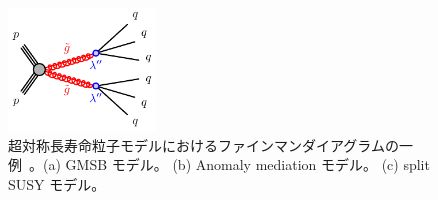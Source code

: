 \begin{figure}[tbp]
    \begin{minipage}{0.98\hsize}
    \centering
    \includegraphics[width=0.35\textwidth]{img/diagram/gogo-3q3q-RPV.pdf}
    \subcaption{}
    \end{minipage}
    \caption[超対称長寿命粒子モデルにおけるファインマンダイアグラムの一例]{超対称長寿命粒子モデルにおけるファインマンダイアグラムの一例~\cite{URL:03}。(a) GMSB モデル。 (b) Anomaly mediation モデル。 (c) split SUSY モデル。}
    \label{fig:dia}
\end{figure}


